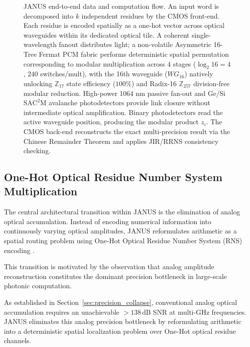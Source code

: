\documentclass[journal]{IEEEtran}
\begin{document}
\begin{figure}[!t]
\caption{JANUS end-to-end data and computation flow. An input word is decomposed into $k$ independent residues by the CMOS front-end. Each residue is encoded spatially as a one-hot vector across optical waveguides within its dedicated optical tile. A coherent single-wavelength fanout distributes light; a non-volatile Asymmetric 16-Tree Fermat PCM fabric performs deterministic spatial permutation corresponding to modular multiplication across 4 stages ($\log_2 16 = 4$, $240$ switches/mult), with the 16th waveguide ($WG_{16}$) natively unlocking $\mathbb{Z}_{17}$ state efficiency ($100\%$) and Radix-16 $\mathbb{Z}_{257}$ division-free modular reduction. High-power 1064 nm passive fan-out and Ge/Si $\mathrm{SAC^2M}$ avalanche photodetectors provide link closure without intermediate optical amplification. Binary photodetectors read the active waveguide position, producing the modular product $z_i$. The CMOS back-end reconstructs the exact multi-precision result via the Chinese Remainder Theorem and applies JIR/RRNS consistency checking.}
\label{fig:janus_dataflow}
\end{figure}


\subsection{\textbf{One-Hot Optical Residue Number System Multiplication}}

The central architectural transition within JANUS is the elimination of analog optical accumulation. Instead of encoding numerical information into continuously varying optical amplitudes, JANUS reformulates arithmetic as a spatial routing problem using One-Hot Optical Residue Number System (RNS) encoding \cite{Omosanya2021}\cite{Huang1979}\cite{Sorger2018}.

This transition is motivated by the observation that analog amplitude reconstruction constitutes the dominant precision bottleneck in large-scale photonic computation.

As established in Section~\ref{sec:precision_collapse}, conventional analog optical accumulation requires an unachievable $>138\,\mathrm{dB}$ SNR at multi-GHz frequencies. JANUS eliminates this analog precision bottleneck by reformulating arithmetic into a deterministic spatial localization problem over One-Hot optical residue channels.
\end{document}
